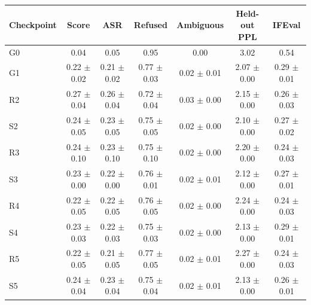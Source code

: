 \begin{tabular}{lcccccc}
\toprule
Checkpoint & Score & ASR & Refused & Ambiguous & Held-out PPL & IFEval \\
\midrule
G0 & 0.04 & 0.05 & 0.95 & 0.00 & 3.02 & 0.54 \\
G1 & 0.22 $\pm$ 0.02 & 0.21 $\pm$ 0.02 & 0.77 $\pm$ 0.03 & 0.02 $\pm$ 0.01 & 2.07 $\pm$ 0.00 & 0.29 $\pm$ 0.01 \\
R2 & 0.27 $\pm$ 0.04 & 0.26 $\pm$ 0.04 & 0.72 $\pm$ 0.04 & 0.03 $\pm$ 0.00 & 2.15 $\pm$ 0.00 & 0.26 $\pm$ 0.03 \\
S2 & 0.24 $\pm$ 0.05 & 0.23 $\pm$ 0.05 & 0.75 $\pm$ 0.05 & 0.02 $\pm$ 0.00 & 2.10 $\pm$ 0.00 & 0.27 $\pm$ 0.02 \\
R3 & 0.24 $\pm$ 0.10 & 0.23 $\pm$ 0.10 & 0.75 $\pm$ 0.10 & 0.02 $\pm$ 0.00 & 2.20 $\pm$ 0.00 & 0.24 $\pm$ 0.03 \\
S3 & 0.23 $\pm$ 0.00 & 0.22 $\pm$ 0.00 & 0.76 $\pm$ 0.01 & 0.02 $\pm$ 0.01 & 2.12 $\pm$ 0.00 & 0.27 $\pm$ 0.01 \\
R4 & 0.22 $\pm$ 0.05 & 0.22 $\pm$ 0.05 & 0.76 $\pm$ 0.05 & 0.02 $\pm$ 0.00 & 2.24 $\pm$ 0.00 & 0.24 $\pm$ 0.03 \\
S4 & 0.23 $\pm$ 0.03 & 0.22 $\pm$ 0.03 & 0.75 $\pm$ 0.03 & 0.02 $\pm$ 0.00 & 2.13 $\pm$ 0.00 & 0.29 $\pm$ 0.01 \\
R5 & 0.22 $\pm$ 0.05 & 0.21 $\pm$ 0.05 & 0.77 $\pm$ 0.05 & 0.02 $\pm$ 0.01 & 2.27 $\pm$ 0.00 & 0.24 $\pm$ 0.03 \\
S5 & 0.24 $\pm$ 0.04 & 0.23 $\pm$ 0.04 & 0.75 $\pm$ 0.04 & 0.02 $\pm$ 0.01 & 2.13 $\pm$ 0.00 & 0.26 $\pm$ 0.01 \\
\bottomrule
\end{tabular}
